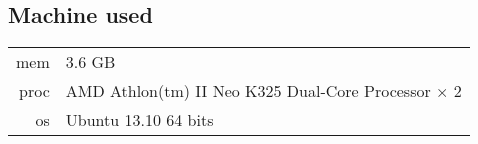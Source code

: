 \subsection{Machine used}

\begin{tabular}{rl}
mem & 3.6 GB\\
proc & AMD Athlon(tm) II Neo K325 Dual-Core Processor × 2\\
os & Ubuntu 13.10 64 bits\\
\end{tabular}
